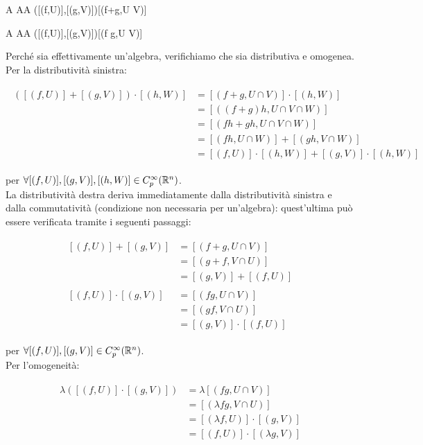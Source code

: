 \map{+}%
	{A \times A}{A}%
	{([(f,U)],[(g,V)])}{[(f+g,U \cap V)]}
	
\map{\cdot}%
	{A \times A}{A}%
	{([(f,U)],[(g,V)])}{[(f g,U \cap V)]}

Perché sia effettivamente un'algebra, verifichiamo che sia distributiva e omogenea.\\
Per la distributività sinistra:

\begin{align}
	\begin{split}
		([(f,U)] + [(g,V)]) \cdot [(h,W)] &= [(f+g,U \cap V)] \cdot [(h,W)]\\
		&= [((f+g) h,U \cap V \cap W)]\\
		&= [(fh + gh,U \cap V \cap W)]\\
		&= [(fh,U \cap W)] + [(gh,V \cap W)]\\
		&= [(f,U)] \cdot [(h,W)] + [(g,V)] \cdot [(h,W)]
	\end{split}
\end{align}

per $ \forall [(f,U)], [(g,V)], [(h,W)] \in C_{p}^{\infty}(\mathbb{R}^{n}) $.\\
La distributività destra deriva immediatamente dalla distributività sinistra e dalla commutatività (condizione non necessaria per un'algebra): quest'ultima può essere verificata tramite i seguenti passaggi:

\begin{align}
	\begin{split}
		[(f,U)] + [(g,V)] &= [(f+g,U \cap V)]\\
		&= [(g+f,V \cap U)]\\
		&= [(g,V)] + [(f,U)]\\\\
		[(f,U)] \cdot [(g,V)] &= [(fg,U \cap V)]\\
		&= [(gf,V \cap U)]\\
		&= [(g,V)] \cdot [(f,U)]
	\end{split}
\end{align}

per $ \forall [(f,U)], [(g,V)] \in C_{p}^{\infty}(\mathbb{R}^{n}) $.\\
Per l'omogeneità:

\begin{align}
	\begin{split}
		\lambda ([(f,U)] \cdot [(g,V)]) &= \lambda [(fg,U \cap V)]\\
		&= [(\lambda fg,V \cap U)]\\
		&= [(\lambda f,U)] \cdot [(g,V)]\\
		&= [(f,U)] \cdot [(\lambda g,V)]
	\end{split}
\end{align}

